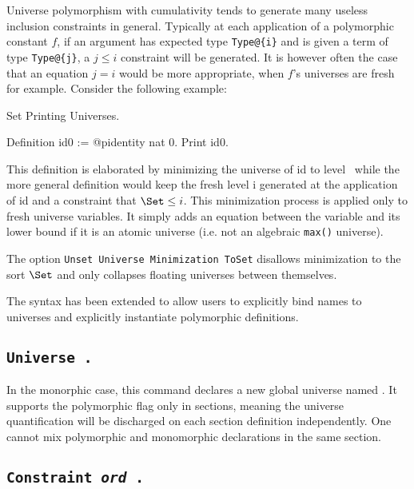 
Universe polymorphism with cumulativity tends to generate many useless
inclusion constraints in general. Typically at each application of a
polymorphic constant $f$, if an argument has expected type
\verb|Type@{i}| and is given a term of type \verb|Type@{j}|, a $j \le i$
constraint will be generated. It is however often the case that an
equation $j = i$ would be more appropriate, when $f$'s
universes are fresh for example. Consider the following example:

\begin{coq_eval}
Set Printing Universes.
\end{coq_eval}
\begin{coq_example}
Definition id0 := @pidentity nat 0.
Print id0.
\end{coq_example}

This definition is elaborated by minimizing the universe of id to level
\Set~while the more general definition would keep the fresh level i
generated at the application of id and a constraint that $\Set \le i$.
This minimization process is applied only to fresh universe
variables. It simply adds an equation between the variable and its lower
bound if it is an atomic universe (i.e. not an algebraic \texttt{max()}
universe).

The option \texttt{Unset Universe Minimization ToSet} disallows
minimization to the sort $\Set$ and only collapses floating universes
between themselves.


The syntax has been extended to allow users to explicitly bind names to
universes and explicitly instantiate polymorphic definitions.

\subsection{\tt Universe {\ident}.
  \label{UniverseCmd}}

In the monorphic case, this command declares a new global universe named
{\ident}. It supports the polymorphic flag only in sections, meaning the
universe quantification will be discharged on each section definition
independently. One cannot mix polymorphic and monomorphic declarations
in the same section.

\subsection{\tt Constraint {\ident} {\textit{ord}} {\ident}.
  \label{ConstraintCmd}}

